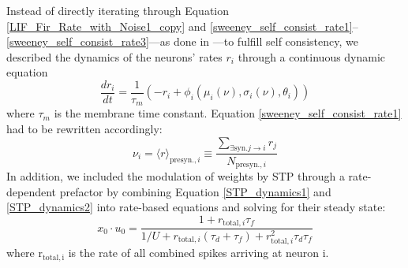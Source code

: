 \documentclass[10pt,a4paper]{article}
\begin{document}
Instead of directly iterating through Equation \eqref{LIF_Fir_Rate_with_Noise1_copy} and \eqref{sweeney_self_consist_rate1}--\eqref{sweeney_self_consist_rate3}---as done in \cite{Sweeney_Paper}---to fulfill self consistency, we described the dynamics of the neurons' rates $r_i$ through a continuous dynamic equation
\begin{equation}
\frac{dr_i}{dt} = \frac{1}{\tau_m} \left( -r_i + \phi_i(\mu_i(\nu),\sigma_i(\nu),\theta_i) \right)
\label{dyn_rate_equation}
\end{equation}
where $\tau_m$ is the membrane time constant. Equation \eqref{sweeney_self_consist_rate1} had to be rewritten accordingly:
\begin{equation}
\nu_i = {\langle r \rangle}_{\mathrm{ presyn.},i} \equiv \frac{\sum_{\mathrm{ \exists syn.} j\rightarrow i} r_j}{N_{\mathrm{ presyn.}, i}}
\label{sweeney_self_consist_rate1_mod}
\end{equation}
In addition, we included the modulation of weights by STP through a rate-dependent prefactor by combining Equation \eqref{STP_dynamics1} and \eqref{STP_dynamics2} into rate-based equations and solving for their steady state:
\begin{equation}
x_{0}\cdot u_{0} = \frac{1+r_{\mathrm{ total},i} \tau_f}{1/U + r_{\mathrm{ total},i} (\tau_d + \tau_f)+ r_{\mathrm{ total},i}^2 \tau_d \tau_f}
\label{STP_steady}
\end{equation}
where $\mathrm{r_{\mathrm{ total},i}}$ is the rate of all combined spikes arriving at neuron i.
\end{document}
